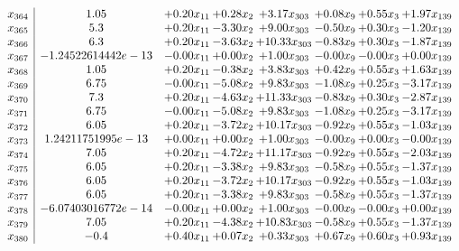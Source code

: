 \documentclass[8pt]{article}
\begin{document}
\[\begin{array}{c| c c@{\hskip 2pt} c@{\hskip 2pt} c@{\hskip 2pt} c@{\hskip 2pt} c@{\hskip 2pt} c@{\hskip 2pt} }
 x_{364}   &  1.05 & +  0.20 x_{11} & +  0.28 x_{2} & +  3.17 x_{303} & +  0.08 x_{9} & +  0.55 x_{3} & +  1.97 x_{139}\\
 x_{365}   &  5.3 & +  0.20 x_{11} & -3.30 x_{2} & +  9.00 x_{303} & -0.50 x_{9} & +  0.30 x_{3} & -1.20 x_{139}\\
 x_{366}   &  6.3 & +  0.20 x_{11} & -3.63 x_{2} & + 10.33 x_{303} & -0.83 x_{9} & +  0.30 x_{3} & -1.87 x_{139}\\
 x_{367}   &  -1.24522614442e-13 & -0.00 x_{11} & +  0.00 x_{2} & +  1.00 x_{303} & -0.00 x_{9} & -0.00 x_{3} & +  0.00 x_{139}\\
 x_{368}   &  1.05 & +  0.20 x_{11} & -0.38 x_{2} & +  3.83 x_{303} & +  0.42 x_{9} & +  0.55 x_{3} & +  1.63 x_{139}\\
 x_{369}   &  6.75 & -0.00 x_{11} & -5.08 x_{2} & +  9.83 x_{303} & -1.08 x_{9} & +  0.25 x_{3} & -3.17 x_{139}\\
 x_{370}   &  7.3 & +  0.20 x_{11} & -4.63 x_{2} & + 11.33 x_{303} & -0.83 x_{9} & +  0.30 x_{3} & -2.87 x_{139}\\
 x_{371}   &  6.75 & -0.00 x_{11} & -5.08 x_{2} & +  9.83 x_{303} & -1.08 x_{9} & +  0.25 x_{3} & -3.17 x_{139}\\
 x_{372}   &  6.05 & +  0.20 x_{11} & -3.72 x_{2} & + 10.17 x_{303} & -0.92 x_{9} & +  0.55 x_{3} & -1.03 x_{139}\\
 x_{373}   &  1.24211751995e-13 & +  0.00 x_{11} & +  0.00 x_{2} & +  1.00 x_{303} & -0.00 x_{9} & +  0.00 x_{3} & -0.00 x_{139}\\
 x_{374}   &  7.05 & +  0.20 x_{11} & -4.72 x_{2} & + 11.17 x_{303} & -0.92 x_{9} & +  0.55 x_{3} & -2.03 x_{139}\\
 x_{375}   &  6.05 & +  0.20 x_{11} & -3.38 x_{2} & +  9.83 x_{303} & -0.58 x_{9} & +  0.55 x_{3} & -1.37 x_{139}\\
 x_{376}   &  6.05 & +  0.20 x_{11} & -3.72 x_{2} & + 10.17 x_{303} & -0.92 x_{9} & +  0.55 x_{3} & -1.03 x_{139}\\
 x_{377}   &  6.05 & +  0.20 x_{11} & -3.38 x_{2} & +  9.83 x_{303} & -0.58 x_{9} & +  0.55 x_{3} & -1.37 x_{139}\\
 x_{378}   &  -6.07403016772e-14 & -0.00 x_{11} & +  0.00 x_{2} & +  1.00 x_{303} & -0.00 x_{9} & -0.00 x_{3} & +  0.00 x_{139}\\
 x_{379}   &  7.05 & +  0.20 x_{11} & -4.38 x_{2} & + 10.83 x_{303} & -0.58 x_{9} & +  0.55 x_{3} & -1.37 x_{139}\\
 x_{380}   &  -0.4 & +  0.40 x_{11} & +  0.07 x_{2} & +  0.33 x_{303} & +  0.67 x_{9} & +  0.60 x_{3} & +  0.93 x_{139}\\

\end{array}\]
\end{document}
